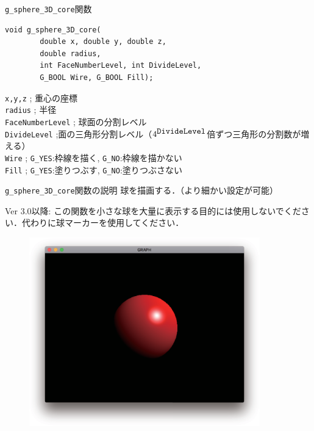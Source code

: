 \documentclass[platex,a4paper,12pt]{jsarticle}%
\begin{document}
\begin{itembox}[l]{\texttt{g\_sphere\_3D\_core}関数}
\begin{verbatim}
void g_sphere_3D_core(
        double x, double y, double z,
        double radius,
        int FaceNumberLevel, int DivideLevel, 
        G_BOOL Wire, G_BOOL Fill);   
\end{verbatim}
\verb|x,y,z| ; 重心の座標\\
\verb|radius| ; 半径\\
\verb|FaceNumberLevel| ; 球面の分割レベル\\
\verb|DivideLevel| ;面の三角形分割レベル（$4^{\verb|DivideLevel|}$倍ずつ三角形の分割数が増える）\\
\verb|Wire| ; \verb|G_YES|:枠線を描く, \verb|G_NO|:枠線を描かない \\
\verb|Fill| ; \verb|G_YES|:塗りつぶす, \verb|G_NO|:塗りつぶさない
\end{itembox}

\begin{itembox}[l]{\texttt{g\_sphere\_3D\_core}関数の説明}
球を描画する．（より細かい設定が可能）

Ver 3.0以降: この関数を小さな球を大量に表示する目的には使用しないでください．代わりに球マーカーを使用してください．
\end{itembox}

\begin{figure}[htb]
\centering
\includegraphics[width=100mm]{Canvas_g_sphere_SDL.eps}
\end{figure}
\end{document}
